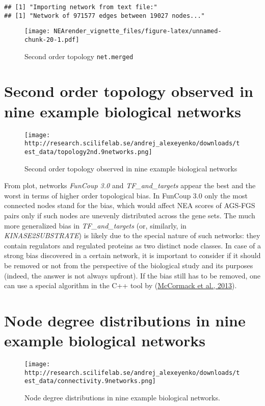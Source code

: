 \documentclass[]{article}
\begin{document}
\begin{verbatim}
## [1] "Importing network from text file:"
## [1] "Network of 971577 edges between 19027 nodes..."
\end{verbatim}

\begin{figure}
\centering
\texttt{[image: NEArender\_vignette\_files/figure-latex/unnamed-chunk-20-1.pdf]}
\caption{Second order topology \texttt{net.merged}}
\end{figure}

\section{Second order topology observed in nine example biological
networks}\label{second-order-topology-observed-in-nine-example-biological-networks}

\begin{figure}
\centering
\texttt{[image: http://research.scilifelab.se/andrej\_alexeyenko/downloads/test\_data/topology2nd.9networks.png]}
\caption{Second order topology observed in nine example biological
networks \label{figlab1}}
\end{figure}

From plot, networks \emph{FunCoup 3.0} and \emph{TF\_and\_targets}
appear the best and the worst in terms of higher order topological bias.
In FunCoup 3.0 only the most connected nodes stand for the bias, which
would affect NEA scores of AGS-FGS pairs only if such nodes are unevenly
distributed across the gene sets. The much more generalized bias in
\emph{TF\_and\_targets} (or, similarly, in \emph{KINASE2SUBSTRATE}) is
likely due to the special nature of such networks: they contain
regulators and regulated proteins as two distinct node classes. In case
of a strong bias discovered in a certain network, it is important to
consider if it should be removed or not from the perspective of the
biological study and its purposes (indeed, the answer is not always
upfront). If the bias still has to be removed, one can use a special
algorithm in the C++ tool by
(\href{http://www.ncbi.nlm.nih.gov/pubmed/23372799}{McCormack et al.,
2013}).

\section{Node degree distributions in nine example biological
networks}\label{node-degree-distributions-in-nine-example-biological-networks}

\begin{figure}
\centering
\texttt{[image: http://research.scilifelab.se/andrej\_alexeyenko/downloads/test\_data/connectivity.9networks.png]}
\caption{Node degree distributions in nine example biological
networks.\label{figlab2}}
\end{figure}
\end{document}
